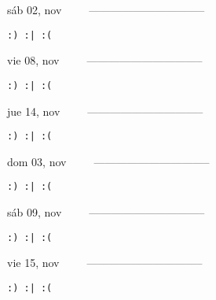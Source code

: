 \documentclass[letterpaper,10pt]{article}
\begin{document}
\begin{multicols}{3}
{sáb 02, nov\ \ \ \ \ --------------------------------}
\begin{flushright}\begin{small}\texttt{:) :| :(}\end{small}\end{flushright}
\vfill
{vie 08, nov\ \ \ \ \ --------------------------------}
\begin{flushright}\begin{small}\texttt{:) :| :(}\end{small}\end{flushright}\par
\vfill
{jue 14, nov\ \ \ \ \ --------------------------------}
\begin{flushright}\begin{small}\texttt{:) :| :(}\end{small}\end{flushright}\par
\vfill
\end{multicols}
\vspace{1.05cm}

\begin{multicols}{3}
{dom 03, nov\ \ \ \ \ --------------------------------}
\begin{flushright}\begin{small}\texttt{:) :| :(}\end{small}\end{flushright}
\vfill
{sáb 09, nov\ \ \ \ \ --------------------------------}
\begin{flushright}\begin{small}\texttt{:) :| :(}\end{small}\end{flushright}\par
\vfill
{vie 15, nov\ \ \ \ \ --------------------------------}
\begin{flushright}\begin{small}\texttt{:) :| :(}\end{small}\end{flushright}\par
\vfill
\end{multicols}
\vspace{1.05cm}
\end{document}
